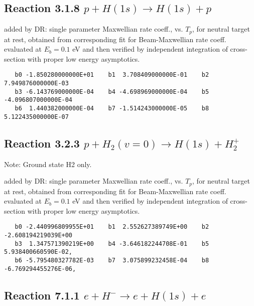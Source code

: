 \newpage

\subsection{
Reaction 3.1.8 $  p + H(1s) \rightarrow H(1s) + p$}

added by DR: single parameter Maxwellian rate coeff., vs. $T_p$, for neutral target at rest,
obtained from corresponding fit for Beam-Maxwellian rate coeff. evaluated at $E_b =0.1$ eV
and then verified by independent integration of cross-section with proper low energy asymptotics.

\begin{small}\begin{verbatim}
   b0 -1.850280000000E+01    b1  3.708409000000E-01    b2  7.949876000000E-03
   b3 -6.143769000000E-04    b4 -4.698969000000E-04    b5 -4.096807000000E-04
   b6  1.440382000000E-04    b7 -1.514243000000E-05    b8  5.122435000000E-07
\end{verbatim}\end{small}

\subsection{
Reaction 3.2.3 $  p + H_2(v=0) \rightarrow H(1s) + H_2^+$}

Note:  Ground state H2 only.

added by DR: single parameter Maxwellian rate coeff., vs. $T_p$, for neutral target at rest,
obtained from corresponding fit for Beam-Maxwellian rate coeff. evaluated at $E_b =0.1$ eV
and then verified by independent integration of cross-section with proper low energy asymptotics.

\begin{small}\begin{verbatim}
   b0 -2.440996809955E+01    b1  2.552627389749E+00    b2 -2.608194219039E+00
   b3  1.347571390219E+00    b4 -3.646182244708E-01    b5  5.938400660590E-02,
   b6 -5.795480327782E-03    b7  3.075899232458E-04    b8 -6.769294455276E-06,

\end{verbatim}\end{small}

\newpage




\subsection{
Reaction 7.1.1 $   e + H^- \rightarrow e + H(1s) + e$}


